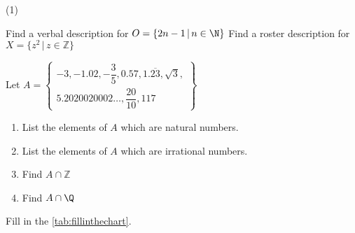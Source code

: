 \label{ExercisesforAppSetTheory}

\begin{tasks}(1)

\task Find a verbal description for $O = \{ 2n-1 \, | \, n \in \N\}$
\task Find a roster description for $X = \{ z^2 \, | \, z \in \mathbb{Z}\}$

\task Let $A = \left\{ \begin{multlined} -3, -1.02, -\dfrac{3}{5}, 0.57, 1.\overline{23}, \sqrt{3}, \\ 5.2020020002 \ldots, \dfrac{20}{10}, 117 \end{multlined}  \right\} $

\begin{enumerate}[label=(\alph*)]

\item  List the elements of $A$ which are natural numbers.
\item  List the elements of $A$ which are irrational numbers.
\item  Find $A \cap \mathbb{Z}$
\item  Find $A \cap \Q$

\end{enumerate}

\task Fill in the \autoref{tab:fillinthechart}.

\end{tasks}

